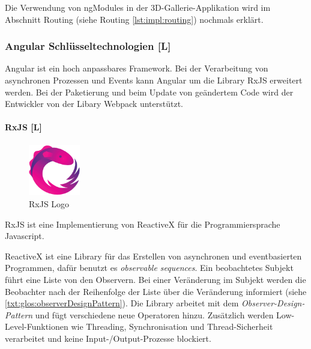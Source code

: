 Die Verwendung von ngModules in der 3D-Gallerie-Applikation wird im Abschnitt Routing (siehe Routing \ref{lst:impl:routing}) nochmals erklärt.
\cite{AngularNgModules}
\cite{AngularNgModulesAPI}
\cite{AngularBuch}


\subsubsection{Angular Schlüsseltechnologien [L]}
Angular ist ein hoch anpassbares Framework. Bei der Verarbeitung von asynchronen Prozessen und Events kann Angular um die Library RxJS erweitert werden. Bei der Paketierung und beim Update von geändertem Code wird der Entwickler von der Libary Webpack unterstützt. 

\paragraph{RxJS [L]}
\label{RxJS}
\begin{figure}
  \begin{center}
    \includegraphics[width=0.2\textwidth]{pics/RxJs_logo.png}
   \caption{RxJS Logo}
  \end{center}
\end{figure}
RxJS ist eine Implementierung von ReactiveX für die Programmiersprache Javascript.

ReactiveX ist eine Library für das Erstellen von asynchronen und eventbasierten Programmen, dafür benutzt es \emph{observable sequences}. Ein beobachtetes Subjekt führt eine Liste von den Observern. Bei einer Veränderung im Subjekt werden die Beobachter nach der Reihenfolge der Liste über die Veränderung informiert (siehe \ref{txt:glos:observerDesignPattern}).
Die Library arbeitet mit dem \emph{Observer-Design-Pattern} und fügt verschiedene neue Operatoren hinzu. Zusätzlich werden Low-Level-Funktionen wie Threading, Synchronisation und Thread-Sicherheit verarbeitet und keine Input-/Output-Prozesse blockiert. \cite{ReactiveXIntro}

